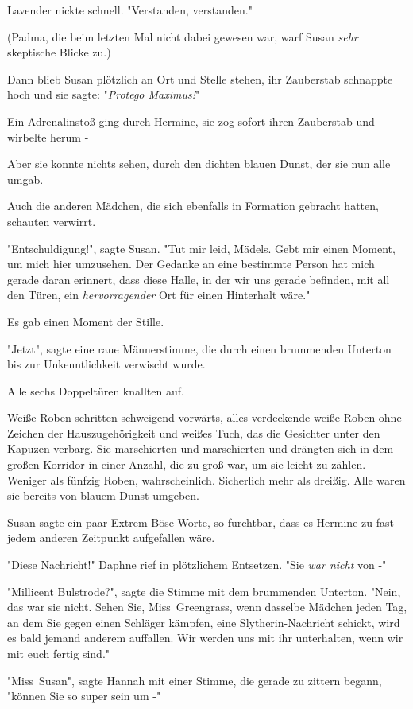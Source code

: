 {Lavender nickte schnell. "Verstanden, verstanden."

(Padma, die beim letzten Mal nicht dabei gewesen war, warf Susan \emph{sehr} skeptische Blicke zu.)

Dann blieb Susan plötzlich an Ort und Stelle stehen, ihr Zauberstab schnappte hoch und sie sagte: "\emph{Protego Maximus!}"

Ein Adrenalinstoß ging durch Hermine, sie zog sofort ihren Zauberstab und wirbelte herum -

Aber sie konnte nichts sehen, durch den dichten blauen Dunst, der sie nun alle umgab.

Auch die anderen Mädchen, die sich ebenfalls in Formation gebracht hatten, schauten verwirrt.

"Entschuldigung!", sagte Susan. "Tut mir leid, Mädels. Gebt mir einen Moment, um mich hier umzusehen. Der Gedanke an eine bestimmte Person hat mich gerade daran erinnert, dass diese Halle, in der wir uns gerade befinden, mit all den Türen, ein \emph{hervorragender} Ort für einen Hinterhalt wäre."

Es gab einen Moment der Stille.

"Jetzt", sagte eine raue Männerstimme, die durch einen brummenden Unterton bis zur Unkenntlichkeit verwischt wurde.

Alle sechs Doppeltüren knallten auf.

Weiße Roben schritten schweigend vorwärts, alles verdeckende weiße Roben ohne Zeichen der Hauszugehörigkeit und weißes Tuch, das die Gesichter unter den Kapuzen verbarg. Sie marschierten und marschierten und drängten sich in dem großen Korridor in einer Anzahl, die zu groß war, um sie leicht zu zählen. Weniger als fünfzig Roben, wahrscheinlich. Sicherlich mehr als dreißig. Alle waren sie bereits von blauem Dunst umgeben.

Susan sagte ein paar Extrem Böse Worte, so furchtbar, dass es Hermine zu fast jedem anderen Zeitpunkt aufgefallen wäre.

"Diese Nachricht!" Daphne rief in plötzlichem Entsetzen. "Sie \emph{war nicht} von -"

"Millicent Bulstrode?", sagte die Stimme mit dem brummenden Unterton. "Nein, das war sie nicht. Sehen Sie, Miss~Greengrass, wenn dasselbe Mädchen jeden Tag, an dem Sie gegen einen Schläger kämpfen, eine Slytherin-Nachricht schickt, wird es bald jemand anderem auffallen. Wir werden uns mit ihr unterhalten, wenn wir mit euch fertig sind."

"Miss~Susan", sagte Hannah mit einer Stimme, die gerade zu zittern begann, "können Sie so super sein um -"

}
